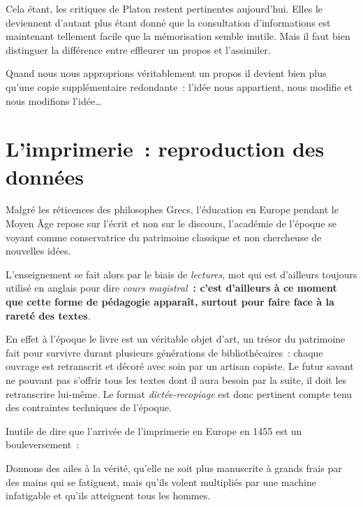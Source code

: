 Cela étant, les critiques de Platon restent pertinentes aujourd'hui. Elles le deviennent d'autant plus étant donné que la consultation d'informations est maintenant tellement facile que la mémorisation semble inutile. Mais il faut bien distinguer la différence entre effleurer un propos et l'assimiler.

Quand nous nous approprions véritablement un propos il devient bien
plus qu'une copie supplémentaire redondante~: l'idée nous appartient,
nous modifie et nous modifions l'idée\ldots

\chapter{L'imprimerie~: reproduction des données}

Malgré les réticences des philosophes Grecs, l'éducation en Europe
pendant le Moyen Âge repose sur l'écrit et non sur le discours, l'académie de l'époque se voyant comme conservatrice du patrimoine classique et non chercheuse de nouvelles idées\cite{friesen-the-lecture}.

L'enseignement se fait alors par le biais de \emph{lectures}, mot qui est d'ailleurs toujours utilisé en anglais pour dire \emph{cours magistral}\textbf{~: c'est d'ailleurs à ce moment que cette forme de pédagogie apparaît, surtout pour faire face à la rareté des textes}.

En effet à l'époque le livre est un véritable objet d'art, un trésor
du patrimoine fait pour survivre durant plusieurs générations de
bibliothécaires~: chaque ouvrage est retranscrit et décoré avec soin
par un artisan copiste. Le futur savant ne pouvant pas s'offrir tous les textes dont il aura besoin par la suite, il doit les retranscrire lui-même\cite{friesen-the-lecture}. Le format \emph{dictée-recopiage} est donc pertinent compte tenu des contraintes techniques de l'époque. 

Inutile de dire que l'arrivée de l'imprimerie en Europe en 1455\cite{walsham2003} est un bouleversement~:

\begin{coolquote}
Donnons des ailes à la vérité, qu'elle ne soit plus manuscrite à grands frais par des mains qui se fatiguent, mais qu'ils volent multipliés par une machine infatigable et qu'ils atteignent tous les hommes.
\end{coolquote}

